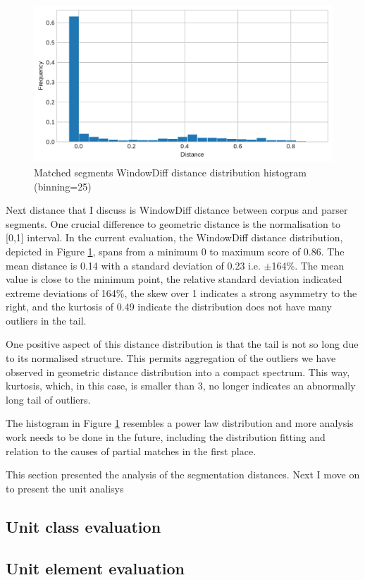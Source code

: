    \begin{figure}[!ht]
    \centering
    \includegraphics[width=.85\textwidth]{evaluation-results/figures/distance-distribution-histogram-WindowDiff-25.pdf}
    \caption{Matched segments WindowDiff distance distribution histogram (binning=25)}
    \label{fig:distance-distribution-histogram-WindowDiff-25}
    \end{figure}
    
    Next distance that I discuss is WindowDiff distance between corpus and parser segments. One crucial difference to geometric distance is the normalisation to [0,1] interval. In the current evaluation, the WindowDiff distance distribution, depicted in Figure \ref{fig:distance-distribution-histogram-WindowDiff-25}, spans from a minimum 0 to maximum score of 0.86. The mean distance is 0.14 with a standard deviation of 0.23 i.e. $\pm$164\%. The mean value is close to the minimum point, the relative standard deviation indicated extreme deviations of 164\%, the skew over 1 indicates a strong asymmetry to the right, and the kurtosis of 0.49 indicate the distribution does not have many outliers in the tail. 
    
    One positive aspect of this distance distribution is that the tail is not so long due to its normalised structure. This permits aggregation of the outliers we have observed in geometric distance distribution into a compact spectrum. This way, kurtosis, which, in this case, is smaller than 3, no longer indicates an abnormally long tail of outliers. 
    
    The histogram in Figure \ref{fig:distance-distribution-histogram-WindowDiff-25} resembles a power law distribution and more analysis work needs to be done in the future, including the distribution fitting and relation to the causes of partial matches in the first place. 
    
    This section presented the analysis of the segmentation distances. Next I move on to present the unit analisys 

\subsection{Unit class evaluation}
\label{sec:unit-class-evaluation}

\subsection{Unit element evaluation}
\label{sec:unit-element-evaluation}


